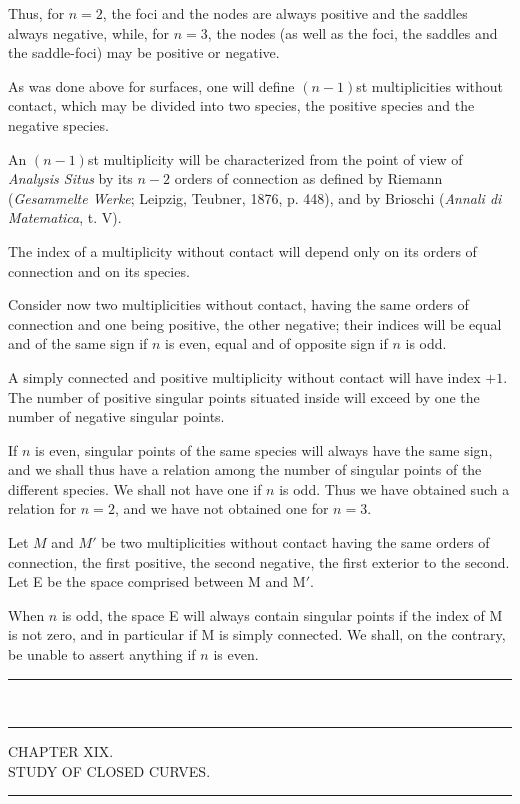 \documentclass[11pt]{article}
\newcommand{\ornament}{\begin{center}\rule{2.5em}{0.4pt}\,\raisebox{0.1ex}{\tiny$\bullet\bullet\bullet$}\,\rule{2.5em}{0.4pt}\end{center}}
\newcommand{\shortline}{\begin{center}\rule{3.5em}{0.4pt}\end{center}}
\begin{document}
Thus, for $n=2$, the foci and the nodes are always positive and the saddles always negative, while, for $n=3$, the nodes (as well as the foci, the saddles and the saddle-foci) may be positive or negative.

As was done above for surfaces, one will define $(n-1)$st multiplicities without contact, which may be divided into two species, the positive species and the negative species.

An $(n-1)$st multiplicity will be characterized from the point of view of \emph{Analysis Situs} by its $n-2$ orders of connection as defined by Riemann (\emph{Gesammelte Werke}; Leipzig, Teubner, 1876, p. 448), and by Brioschi (\emph{Annali di Matematica}, t. V).

The index of a multiplicity without contact will depend only on its orders of connection and on its species.

Consider now two multiplicities without contact, having the same orders of connection and one being positive, the other negative; their indices will be equal and of the same sign if $n$ is even, equal and of opposite sign if $n$ is odd.

A simply connected and positive multiplicity without contact will have index $+1$. The number of positive singular points situated inside will exceed by one the number of negative singular points.

If $n$ is even, singular points of the same species will always have the same sign, and we shall thus have a relation among the number of singular points of the different species. We shall not have one if $n$ is odd. Thus we have obtained such a relation for $n=2$, and we have not obtained one for $n=3$.

Let $M$ and $M'$ be two multiplicities without contact having the same orders of connection, the first positive, the second negative, the first exterior to the second. Let E be the space comprised between M and M$'$.

When $n$ is odd, the space E will always contain singular points if the index of M is not zero, and in particular if M is simply connected. We shall, on the contrary, be unable to assert anything if $n$ is even.

\ornament

\clearpage
\begin{center}
{\Large CHAPTER XIX.}\\[0.6em]
{\large STUDY OF CLOSED CURVES.}
\end{center}
\shortline
\end{document}
